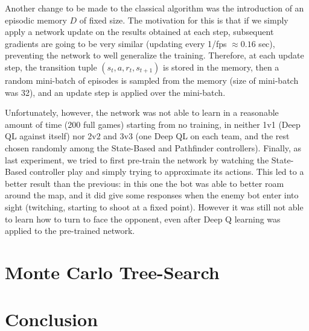\documentclass{article}
\begin{document}
	Another change to be made to the classical algorithm was the introduction of an episodic memory $D$ of fixed size. The motivation for this is that if we simply apply a network update on the results obtained at each step, subsequent gradients are going to be very similar (updating every 1/fps $\approx 0.16$ sec), preventing the network to well generalize the training. Therefore, at each update step, the transition tuple $(s_t,a,r_t,s_{t+1})$ is stored in the memory, then a random mini-batch of episodes is sampled from the memory (size of mini-batch was 32), and an update step is applied over the mini-batch.
	
	Unfortunately, however, the network was not able to learn in a reasonable amount of time (200 full games) starting from no training, in neither 1v1 (Deep QL against itself) nor 2v2 and 3v3 (one Deep QL on each team, and the rest chosen randomly among the State-Based and Pathfinder controllers). Finally, as last experiment, we tried to first pre-train the network by watching the State-Based controller play and simply trying to approximate its actions. This led to a better result than the previous: in this one the bot was able to better roam around the map, and it did give some responses when the enemy bot enter into sight (twitching, starting to shoot at a fixed point). However it was still not able to learn how to turn to face the opponent, even after Deep Q learning was applied to the pre-trained network.
	
	
	\section{Monte Carlo Tree-Search}
	
	
	
	\section{Conclusion}
	
	
	
\end{document}
